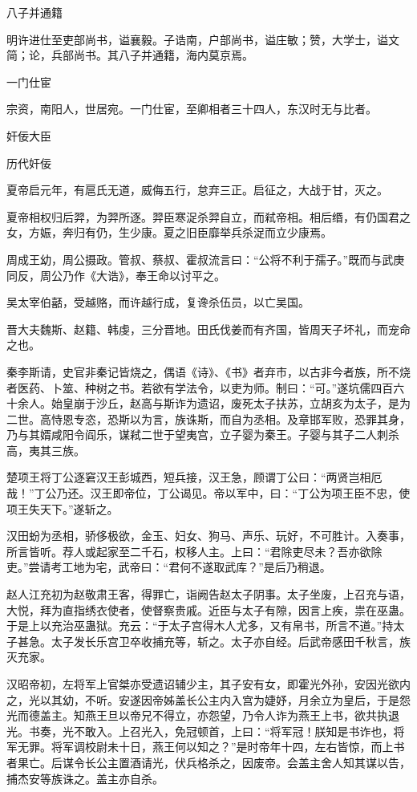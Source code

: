 \documentclass[a4paper,12pt,UTF8,twoside]{ctexbook}
\begin{document}
    八子并通籍
    
    明许进仕至吏部尚书，谥襄毅。子诰南，户部尚书，谥庄敏；赞，大学士，谥文简；论，兵部尚书。其八子并通籍，海内莫京焉。
    
    一门仕宦
    
    宗资，南阳人，世居宛。一门仕宦，至卿相者三十四人，东汉时无与比者。
    
    奸佞大臣
    
    历代奸佞
    
    夏帝启元年，有扈氏无道，威侮五行，怠弃三正。启征之，大战于甘，灭之。
    
    夏帝相权归后羿，为羿所逐。羿臣寒浞杀羿自立，而弒帝相。相后缗，有仍国君之女，方娠，奔归有仍，生少康。夏之旧臣靡举兵杀浞而立少康焉。
    
    周成王幼，周公摄政。管叔、蔡叔、霍叔流言曰：“公将不利于孺子。”既而与武庚同反，周公乃作《大诰》，奉王命以讨平之。
    
    吴太宰伯嚭，受越赂，而许越行成，复谗杀伍员，以亡吴国。
    
    晋大夫魏斯、赵籍、韩虔，三分晋地。田氏伐姜而有齐国，皆周天子坏礼，而宠命之也。
    
    秦李斯请，史官非秦记皆烧之，偶语《诗》、《书》者弃市，以古非今者族，所不烧者医药、卜筮、种树之书。若欲有学法令，以吏为师。制曰：“可。”遂坑儒四百六十余人。始皇崩于沙丘，赵高与斯诈为遗诏，废死太子扶苏，立胡亥为太子，是为二世。高恃恩专恣，恐斯以为言，族诛斯，而自为丞相。及章邯军败，恐罪其身，乃与其婿咸阳令阎乐，谋弒二世于望夷宫，立子婴为秦王。子婴与其子二人刺杀高，夷其三族。
    
    楚项王将丁公逐窘汉王彭城西，短兵接，汉王急，顾谓丁公曰：“两贤岂相厄哉！”丁公乃还。汉王即帝位，丁公谒见。帝以军中，曰：“丁公为项王臣不忠，使项王失天下。”遂斩之。
    
    汉田蚡为丞相，骄侈极欲，金玉、妇女、狗马、声乐、玩好，不可胜计。入奏事，所言皆听。荐人或起家至二千石，权移人主。上曰：“君除吏尽未？吾亦欲除吏。”尝请考工地为宅，武帝曰：“君何不遂取武库？”是后乃稍退。
    
    赵人江充初为赵敬肃王客，得罪亡，诣阙告赵太子阴事。太子坐废，上召充与语，大悦，拜为直指绣衣使者，使督察贵戚。近臣与太子有隙，因言上疾，祟在巫蛊。于是上以充治巫蛊狱。充云：“于太子宫得木人尤多，又有帛书，所言不道。”持太子甚急。太子发长乐宫卫卒收捕充等，斩之。太子亦自经。后武帝感田千秋言，族灭充家。
    
    汉昭帝初，左将军上官桀亦受遗诏辅少主，其子安有女，即霍光外孙，安因光欲内之，光以其幼，不听。安遂因帝姊盖长公主内入宫为婕妤，月余立为皇后，于是怨光而德盖主。知燕王旦以帝兄不得立，亦怨望，乃令人诈为燕王上书，欲共执退光。书奏，光不敢入。上召光入，免冠顿首，上曰：“将军冠！朕知是书诈也，将军无罪。将军调校尉未十日，燕王何以知之？”是时帝年十四，左右皆惊，而上书者果亡。后谋令长公主置酒请光，伏兵格杀之，因废帝。会盖主舍人知其谋以告，捕杰安等族诛之。盖主亦自杀。
    
\end{document}
